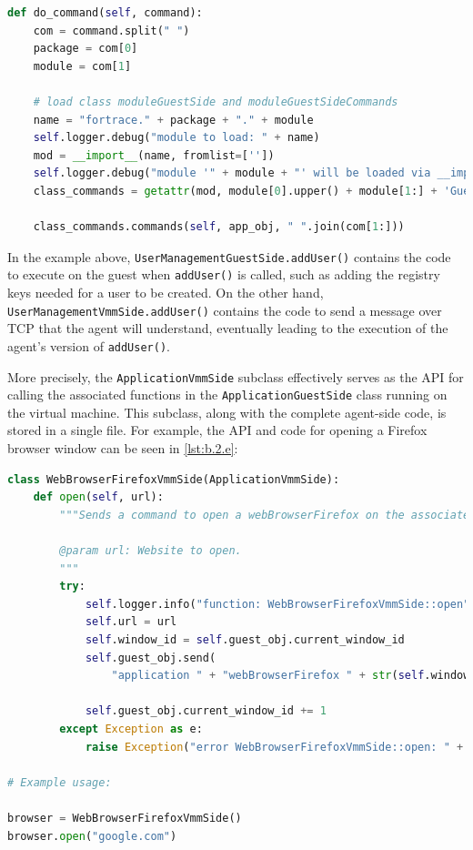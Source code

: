 \documentclass[letterpaper,12pt]{report}
\newcommand{\passthrough}[1]{#1}
\begin{document}
\begin{lstlisting}[label={lst:b.2.d}, caption={Demonstration of ForTrace agent module discovery and command execution}, language=Python]
def do_command(self, command):
    com = command.split(" ")
    package = com[0]
    module = com[1]

    # load class moduleGuestSide and moduleGuestSideCommands
    name = "fortrace." + package + "." + module
    self.logger.debug("module to load: " + name)
    mod = __import__(name, fromlist=[''])
    self.logger.debug("module '" + module + "' will be loaded via __import__")
    class_commands = getattr(mod, module[0].upper() + module[1:] + 'GuestSideCommands')
    
    class_commands.commands(self, app_obj, " ".join(com[1:]))
\end{lstlisting}

In the example above,
\passthrough{\lstinline!UserManagementGuestSide.addUser()!} contains the
code to execute on the guest when \passthrough{\lstinline!addUser()!} is
called, such as adding the registry keys needed for a user to be
created. On the other hand,
\passthrough{\lstinline!UserManagementVmmSide.addUser()!} contains the
code to send a message over TCP that the agent will understand,
eventually leading to the execution of the agent's version of
\passthrough{\lstinline!addUser()!}.

More precisely, the \passthrough{\lstinline!ApplicationVmmSide!}
subclass effectively serves as the API for calling the associated
functions in the \passthrough{\lstinline!ApplicationGuestSide!} class
running on the virtual machine. This subclass, along with the complete
agent-side code, is stored in a single file. For example, the API and
code for opening a Firefox browser window can be seen in
\autoref{lst:b.2.e}:

\begin{lstlisting}[label={lst:b.2.e}, caption={Sample ForTrace agent API implementation}, language=Python]
class WebBrowserFirefoxVmmSide(ApplicationVmmSide):
    def open(self, url):
        """Sends a command to open a webBrowserFirefox on the associated guest.

        @param url: Website to open.
        """
        try:
            self.logger.info("function: WebBrowserFirefoxVmmSide::open")
            self.url = url
            self.window_id = self.guest_obj.current_window_id
            self.guest_obj.send(
                "application " + "webBrowserFirefox " + str(self.window_id) + " open " + self.webBrowserFirefox + " " + self.url)

            self.guest_obj.current_window_id += 1
        except Exception as e:
            raise Exception("error WebBrowserFirefoxVmmSide::open: " + str(e))

# Example usage:

browser = WebBrowserFirefoxVmmSide()
browser.open("google.com")
\end{lstlisting}
\end{document}

